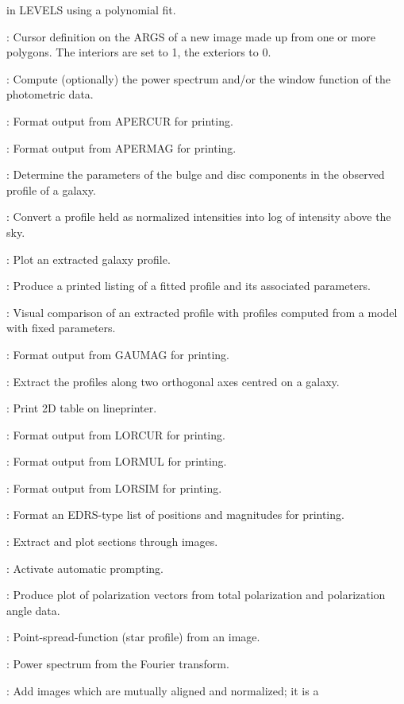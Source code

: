 \begin{description}
in LEVELS using a polynomial fit.
\item [POLYFILLA]: Cursor definition on the ARGS of a new image made up from
one or more polygons.
The interiors are set to 1, the exteriors to 0.
\item [POWER]: Compute (optionally) the power spectrum and/or the window
function of the photometric data.
\item [PRAPERCUR]: Format output from APERCUR for printing.
\item [PRAPERMAG]: Format output from APERMAG for printing.
\item [PRFDECASP]: Determine the parameters of the bulge and disc components in
the observed profile of a galaxy.
\item [PRFLOGASP]: Convert a profile held as normalized intensities into log of
intensity above the sky.
\item [PRFPLTASP]: Plot an extracted galaxy profile.
\item [PRFPRTASP]: Produce a printed listing of a fitted profile and its
associated parameters.
\item [PRFVISASP]: Visual comparison of an extracted profile with profiles
computed from a model with fixed parameters.
\item [PRGAUMAG]: Format output from GAUMAG for printing.
\item [PRIAXEASP]: Extract the profiles along two orthogonal axes centred on a
galaxy.
\item [PRINTTAB]: Print 2D table on lineprinter.
\item [PRLORCUR]: Format output from LORCUR for printing.
\item [PRLORMUL]: Format output from LORMUL for printing.
\item [PRLORSIM]: Format output from LORSIM for printing.
\item [PRMAGS]: Format an EDRS-type list of positions and magnitudes for
printing.
\item [PROFILE]: Extract and plot sections through images.
\item [PROMPT]: Activate automatic prompting.
\item [PRPLOT]: Produce plot of polarization vectors from total polarization
and polarization angle data.
\item [PSFEST]: Point-spread-function (star profile) from an image.
\item [PSPEC]: Power spectrum from the Fourier transform.
\item [PSTACK]: Add images which are mutually aligned and normalized; it is a

\end{description}
